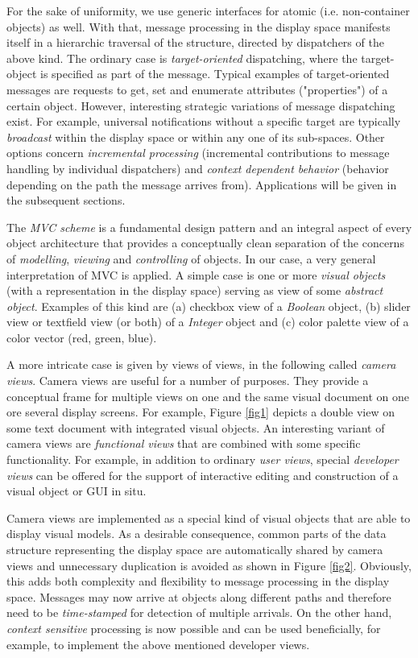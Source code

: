 \ein
For the sake of uniformity, we use generic interfaces for atomic (i.e.
non-container objects) as well. With that, message processing in the display
space manifests itself in a hierarchic traversal of the structure, directed by
dispatchers of the above kind. The ordinary case is {\em target-oriented\/}
dispatching, where the target-object is specified as part of the message.
Typical examples of target-oriented messages are requests to get, set
and enumerate attributes ("properties") of a certain object. However,
interesting strategic variations of message dispatching exist. For example,
universal notifications without a specific target are typically {\em
broadcast\/}
within the display space or within any one of its sub-spaces. Other options
concern {\em incremental processing\/} (incremental contributions
to message handling by individual dispatchers) and {\em context dependent
behavior} (behavior depending on the path the message arrives from).
Applications will be given in the subsequent sections.


The {\em MVC scheme\/} \cite{12} is a fundamental design pattern
and an integral aspect of every object architecture that provides
a conceptually clean separation of the concerns of {\em modelling},
{\em viewing\/} and {\em controlling\/} of objects.
In our case, a very general interpretation of MVC is applied.
A simple case is one or more {\em visual objects\/}
(with a representation in the display space) serving
as view of some {\em abstract object}. Examples of this
kind are (a) checkbox view of a {\em Boolean\/} object,
(b) slider view or textfield view (or both) of a {\em Integer\/}
object and (c) color palette view of a color vector (red, green, blue).

\ein
A more intricate case is given by views of views, in the following called
{\em camera views}. Camera views are useful for a number of purposes.
They provide a conceptual frame for multiple views on one and the same
visual document on one ore several display screens. For example, Figure
\ref{fig1} depicts a double view on some text document with integrated
visual objects. An interesting variant of camera views are
{\em functional views} that are combined with some specific functionality.
For example, in addition to ordinary {\em user views\/}, special
{\em developer views\/} can be offered for the support of interactive
editing and construction of a visual object or GUI in situ.

\ein
Camera views are implemented as a special kind of visual objects that are
able to display visual models. As a desirable consequence, common parts of
the data structure representing the display space are automatically shared
by camera views and unnecessary duplication is avoided as shown in Figure
\ref{fig2}. Obviously, this adds both complexity and flexibility to message
processing in the display space. Messages may now arrive at objects along
different paths and therefore need to be {\em time-stamped\/} for
detection of multiple arrivals. On the other hand, {\em context sensitive\/}
processing is now possible and can be used beneficially, for example,
to implement the above mentioned developer views.

